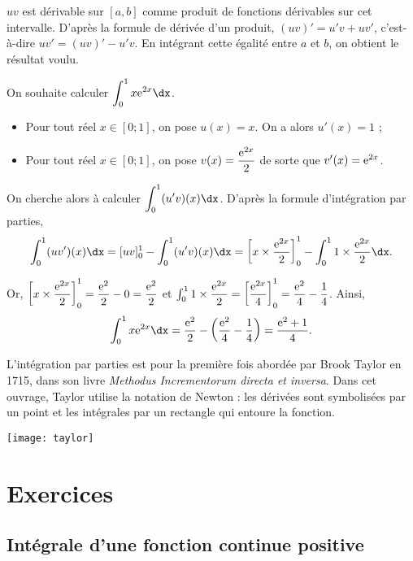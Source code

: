 \documentclass[11pt,fleqn, openany]{book} %
\begin{document}
\begin{demonstration}$uv$ est dérivable sur $[a,b]$ comme produit de fonctions dérivables sur cet intervalle. D'après la formule de dérivée d'un produit, $(uv)'=u'v+uv'$, c'est-à-dire $uv'=(uv)'-u'v$. En intégrant cette égalité entre $a$ et $b$, on obtient le résultat voulu.\end{demonstration}

\begin{example} On souhaite calculer $\displaystyle\int_{0}^1x\e^{2x} \dx$.
\begin{itemize}
\item Pour tout réel $x\in[0;1]$, on pose $u(x)=x$. On a alors $u'(x)=1$ ;
\item Pour tout réel $x\in[0;1]$, on pose $v(x)=\dfrac{\mathrm{e}^{2x}}{2}$ de sorte que $v'(x)=\mathrm{e}^{2x}$.
\end{itemize}

On cherche alors à calculer $\displaystyle\int_{0}^1 (u'v)(x)\dx$. D'après la formule d'intégration par parties,\[\displaystyle\int_{0}^1 (uv')(x)\dx=[uv]_0^1-\displaystyle\int_{0}^1 (u'v)(x)\dx = \left[x \times \dfrac{\e^{2x}}{2} \right]_0^1-\displaystyle\int_{0}^1 1 \times \dfrac{\e^{2x}}{2} \dx.\]

Or, $\left[x \times \dfrac{\mathrm{e}^{2x}}{2} \right]_0^1=\dfrac{\mathrm{e}^2}{2}-0=\dfrac{\mathrm{e}^2}{2}$ et $\int_{0}^1 1 \times \dfrac{\mathrm{e}^{2x}}{2} = \left[\dfrac{\mathrm{e}^{2x}}{4}\right]_0^1=  \dfrac{\mathrm{e}^2}{4}-\dfrac{1}{4}$.
Ainsi,
 \[\displaystyle\int_{0}^1x\e^{2x} \dx = \dfrac{\e^2}{2}-\left(\dfrac{\e^2}{4}-\dfrac{1}{4}\right)=\dfrac{\e^2+1}{4}.\]
\end{example}

L'intégration par parties est pour la première fois abordée par Brook Taylor en 1715, dans son livre \textit{Methodus Incrementorum directa et inversa}. Dans cet ouvrage, Taylor utilise la notation de Newton : les dérivées sont symbolisées par un point et les intégrales par un rectangle qui entoure la fonction. 

\begin{center}
\texttt{[image: taylor]}
\end{center}

\chapter{Exercices}

\section*{Intégrale d'une fonction continue positive}
\end{document}
